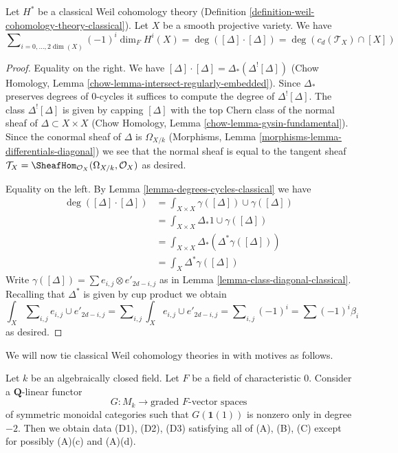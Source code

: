 \begin{lemma}
\label{lemma-square-diagonal-classical}
Let $H^*$ be a classical Weil cohomology theory
(Definition \ref{definition-weil-cohomology-theory-classical}).
Let $X$ be a smooth projective variety. We have
$$
\sum\nolimits_{i = 0, \ldots, 2\dim(X)} (-1)^i\dim_F H^i(X) =
\deg([\Delta] \cdot [\Delta]) = \deg(c_d(\mathcal{T}_X) \cap [X])
$$
\end{lemma}

\begin{proof}
Equality on the right. We have
$[\Delta] \cdot [\Delta] = \Delta_*(\Delta^![\Delta])$
(Chow Homology, Lemma \ref{chow-lemma-intersect-regularly-embedded}).
Since $\Delta_*$ preserves degrees of $0$-cycles it suffices to compute
the degree of $\Delta^![\Delta]$. The class $\Delta^![\Delta]$ is given
by capping $[\Delta]$ with
the top Chern class of the normal sheaf of $\Delta \subset X \times X$
(Chow Homology, Lemma \ref{chow-lemma-gysin-fundamental}).
Since the conormal sheaf of $\Delta$ is $\Omega_{X/k}$
(Morphisms, Lemma \ref{morphisms-lemma-differentials-diagonal})
we see that the normal sheaf is equal to the tangent sheaf
$\mathcal{T}_X = \SheafHom_{\mathcal{O}_X}(\Omega_{X/k}, \mathcal{O}_X)$
as desired.

\medskip\noindent
Equality on the left. By Lemma \ref{lemma-degrees-cycles-classical} we have
\begin{align*}
\deg([\Delta] \cdot [\Delta])
& =
\int_{X \times X} \gamma([\Delta]) \cup \gamma([\Delta]) \\
& =
\int_{X \times X} \Delta_*1 \cup \gamma([\Delta]) \\
& =
\int_{X \times X} \Delta_*(\Delta^*\gamma([\Delta])) \\
& =
\int_X \Delta^*\gamma([\Delta])
\end{align*}
Write $\gamma([\Delta]) = \sum  e_{i, j} \otimes e'_{2d - i , j}$
as in Lemma \ref{lemma-class-diagonal-classical}.
Recalling that $\Delta^*$ is given by cup product we obtain
$$
\int_X \sum\nolimits_{i, j} e_{i, j} \cup e'_{2d - i, j} =
\sum\nolimits_{i, j} \int_X e_{i, j} \cup e'_{2d - i, j} =
\sum\nolimits_{i, j} (-1)^i = \sum (-1)^i\beta_i
$$
as desired.
\end{proof}




\noindent
We will now tie classical Weil cohomology theories in with motives as follows.

\begin{lemma}
\label{lemma-from-functor-to-weil-classical}
Let $k$ be an algebraically closed field. Let $F$ be a field of
characteristic $0$. Consider a $\mathbf{Q}$-linear functor
$$
G : M_k \longrightarrow \text{graded }F\text{-vector spaces}
$$
of symmetric monoidal categories such that $G(\mathbf{1}(1))$
is nonzero only in degree $-2$. Then we obtain data (D1), (D2), (D3)
satisfying all of (A), (B), (C) except for possibly (A)(c) and (A)(d).
\end{lemma}

